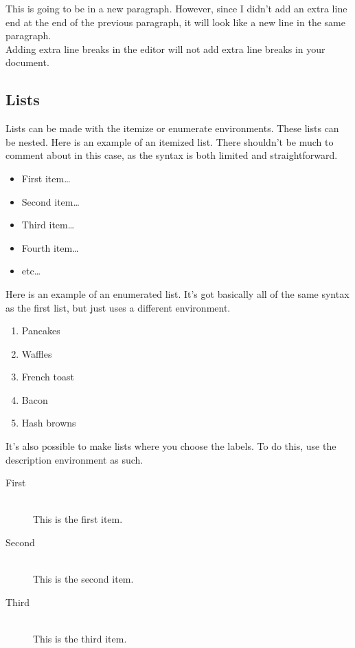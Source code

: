 \documentclass[11pt,letterpaper]{article}
\begin{document}
This is going to be in a new paragraph. However, since I didn't add an extra
line end at the end of the previous paragraph, it will look like a new line in
the same paragraph.\\








Adding extra line breaks in the editor will not add extra line breaks in your
document.

\subsection{Lists}

Lists can be made with the itemize or enumerate environments. These lists can be
nested. Here is an example of an itemized list. There shouldn't be much to
comment about in this case, as the syntax is both limited and straightforward.

\begin{itemize}
    \item First item\dots %
    \item Second item\dots
    \item Third item\dots
    \item Fourth item\dots
    \item etc\dots
\end{itemize}

Here is an example of an enumerated list. It's got basically all of the same
syntax as the first list, but just uses a different environment.

\begin{enumerate}
    \item Pancakes
    \item Waffles
    \item French toast
    \item Bacon
    \item Hash browns
\end{enumerate}

It's also possible to make lists where you choose the labels. To do this, use
the description environment as such.

\begin{description}
\item[First] \hfill \\
    This is the first item.
\item[Second] \hfill \\
    This is the second item.
\item[Third] \hfill \\
    This is the third item.
\end{description}
\end{document}
